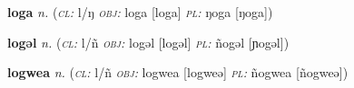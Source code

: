 \newentry
\headword\textbf{loga} 
\ipa{[loga]}
\synpos\textit{n.} 
\class(\textit{\textsc{cl:}} {l/ŋ}
\object\textit{\textsc{obj:}} loga [loga]
\plural\textit{\textsc{pl:}} ŋoga [ŋoga])

\newentry
\headword\textbf{logəl} 
\ipa{[logə́l]}
\synpos\textit{n.} 
\class(\textit{\textsc{cl:}} {l/ñ}
\object\textit{\textsc{obj:}} logəl [logəl]
\plural\textit{\textsc{pl:}} ñogəl [ɲogəl])

\newentry
\headword\textbf{logwea} 
\ipa{[logweə]}
\synpos\textit{n.} 
\class(\textit{\textsc{cl:}} {l/ñ}
\object\textit{\textsc{obj:}} logwea [logweə]
\plural\textit{\textsc{pl:}} ñogwea [ñogweə])

